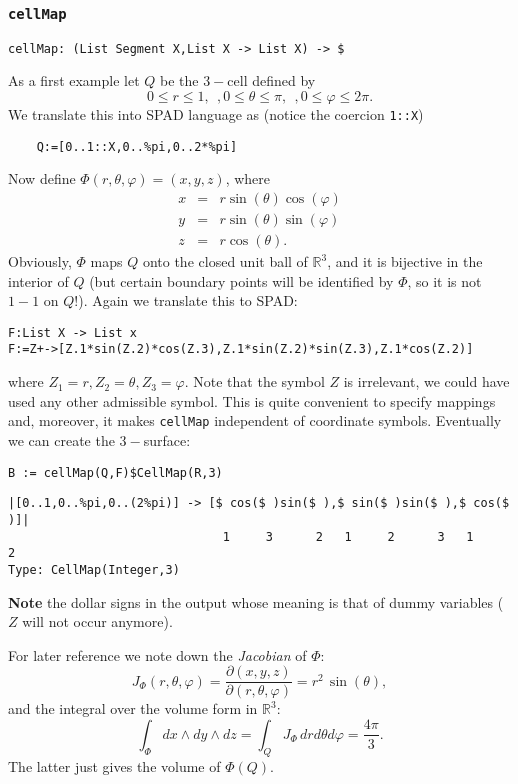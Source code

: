 \documentclass[12pt,a4paper]{article}
\newcommand{\RR}[1]{\mathbb{R}^{#1}}
\begin{document}
\subsubsection{{\tt cellMap}} 
\begin{lstlisting}
cellMap: (List Segment X,List X -> List X) -> $ 
\end{lstlisting}
As a first example let $Q$ be the $3-$cell defined by
\begin{displaymath}
 0\leq r\leq 1,\ \ ,0\leq \theta \leq \pi,\ \ ,0\leq\varphi\leq 2\pi.
\end{displaymath}
We translate this into SPAD language as (notice the coercion {\tt 1::X})
\begin{verbatim}
    Q:=[0..1::X,0..%pi,0..2*%pi]
\end{verbatim}
Now define $\Phi(r,\theta,\varphi)=(x,y,z)$, where
\begin{eqnarray*}
     x &=& r \sin(\theta) \cos(\varphi) \\
     y &=& r \sin(\theta) \sin(\varphi) \\
     z &=& r \cos(\theta).
\end{eqnarray*}
Obviously, $\Phi$  maps $Q$ onto the closed unit ball of $\RR 3$, and
it is bijective in the interior of $Q$ (but certain boundary points
will be identified by $\Phi$, so it is not $1-1$ on $Q$!). Again we
translate this to SPAD:
\begin{lstlisting}
F:List X -> List x
F:=Z+->[Z.1*sin(Z.2)*cos(Z.3),Z.1*sin(Z.2)*sin(Z.3),Z.1*cos(Z.2)]
\end{lstlisting}
where $Z_1=r,Z_2=\theta,Z_3=\varphi$. Note that the symbol $Z$ is
irrelevant, we could have used any other admissible symbol. This
is quite convenient to specify mappings and, moreover, it makes
{\tt cellMap} independent of coordinate symbols. 
Eventually we can create the $3-$surface:
\begin{lstlisting}
B := cellMap(Q,F)$CellMap(R,3)
\end{lstlisting}
\scriptsize
\begin{verbatim}
|[0..1,0..%pi,0..(2%pi)] -> [$ cos($ )sin($ ),$ sin($ )sin($ ),$ cos($ )]|
                              1     3      2   1     2      3   1     2
Type: CellMap(Integer,3)
\end{verbatim}
\normalsize
{\bf Note} the dollar signs in the output whose meaning is that of
dummy variables ($Z$ will not occur anymore).

For later reference we note down the {\em Jacobian} of $\Phi$:
\begin{displaymath}
  J_{\Phi}(r,\theta,\varphi)=
    \frac{\partial(x,y,z)}{\partial(r,\theta,\varphi)} =
      r^2\,\sin(\theta),
\end{displaymath}
and the integral over the volume form in $\RR 3$:
\begin{displaymath}
  \int_{\Phi} dx\wedge dy\wedge dz = \int_{Q} J_{\Phi}\,dr d\theta d\varphi 
  = \frac{4\pi}{3}.
\end{displaymath}
The latter just gives the volume of $\Phi(Q)$.
%
\end{document}
